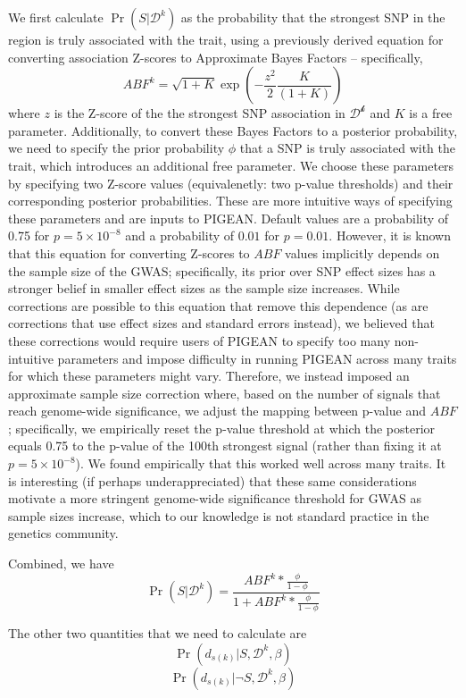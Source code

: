 We first calculate
$\Pr\left(S|\mathcal{D}^k\right)$ as the probability that the
strongest SNP in the region is truly associated with the trait, using
a previously derived equation for converting association Z-scores to Approximate Bayes Factors\cite{} --
specifically,
\[ABF^k = \sqrt{1+K}\exp\left(-\frac{z^2}{2}\frac{K}{\left(1+K\right)}\right)\]
where $z$ is the Z-score of the the strongest SNP association in $\mathcal{D^k}$ and $K$ is a free parameter. Additionally, to convert these Bayes Factors to a
posterior probability, we need to specify the prior probability $\phi$
that a
SNP is truly associated with the trait, which introduces an additional free parameter. We
choose these parameters by specifying two Z-score values
(equivalenetly: two p-value thresholds) and their corresponding
posterior probabilities. These are more intuitive ways of specifying
these parameters and are inputs to PIGEAN. Default values are
a probability of 0.75 for $p=5\times10^{-8}$ and a probability of $0.01$ for
$p=0.01$. However, it is known\cite{} that this equation for
converting Z-scores to $ABF$ values implicitly depends on the sample
size of the GWAS; specifically, its prior over SNP effect
sizes has a stronger belief in smaller effect sizes as the sample size
increases. While corrections are possible to this equation that remove
this dependence (as are
corrections that use effect sizes and standard
errors instead), we believed that these corrections would require users of PIGEAN to specify
too many non-intuitive parameters and impose difficulty in running
PIGEAN across many traits for which these parameters might
vary. Therefore, we instead imposed an approximate sample size
correction where, based on the number of signals that reach
genome-wide significance, we adjust the mapping between p-value and
$ABF$; specifically, we empirically reset the p-value threshold at which the
posterior equals 0.75 to the p-value of the 100th strongest signal
(rather than fixing it at $p=5\times10^{-8}$). We found empirically
that this worked well across many traits. It is interesting (if
perhaps underappreciated) that these same considerations motivate a
more stringent genome-wide significance threshold for GWAS as sample
sizes increase, which to our knowledge is not standard practice in the
genetics community.

Combined, we have
\[
\Pr\left(S|\mathcal{D}^k\right) = \frac{ABF^k * \frac{\phi}{1-\phi}}{1
  + ABF^k * \frac{\phi}{1-\phi}}
\]

The other two quantities that we need to calculate are
\[\Pr\left(d_{s(k)}|S,\mathcal{D}^k,\beta\right)\]
\[\Pr\left(d_{s(k)}|\neg S,\mathcal{D}^k,\beta\right)\]

